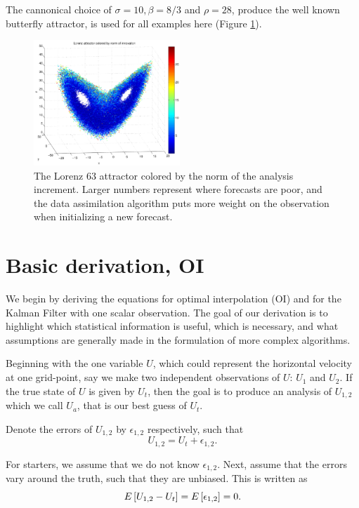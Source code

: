 \documentclass[12pt]{report}
\begin{document}
The cannonical choice of $\sigma = 10, \beta = 8/3$ and $\rho = 28$, produce the well known butterfly attractor, is used for all examples here (Figure \ref{fig:lorenzattractor}).

\begin{figure}[h!]
  \centering
  \includegraphics[width=0.49\textwidth]{figures/attractor-colored-by-innovation-prevPos3.pdf}
  \caption[The Lorenz 63 attractor colored by the norm of the analysis increment]{
    The Lorenz 63 attractor colored by the norm of the analysis increment.
    Larger numbers represent where forecasts are poor, and the data assimilation algorithm puts more weight on the observation when initializing a new forecast.
  }
  \label{fig:lorenzattractor}
\end{figure}

\section{Basic derivation, OI}

We begin by deriving the equations for optimal interpolation (OI) and for the Kalman Filter with one scalar observation.
The goal of our derivation is to highlight which statistical information is useful, which is necessary, and what assumptions are generally made in the formulation of more complex algorithms.

Beginning with the one variable $U$, which could represent the horizontal velocity at one grid-point, say we make two independent observations of $U$: $U_1$ and $U_2$.
If the true state of $U$ is given by $U_t$, then the goal is to produce an analysis of $U_{1,2}$ which we call $U_a$, that is our best guess of $U_t$.

Denote the errors of $U_{1,2}$ by $\epsilon _{1,2}$ respectively, such that
$$ U_{1,2} = U_t + \epsilon _{1,2} .$$

For starters, we assume that we do not know $\epsilon _{1,2}$.
Next, assume that the errors vary around the truth, such that they are unbiased.
This is written as
\begin{equation*} E \left [ U_{1,2}-U_t \right ] = E \left [ \epsilon _{1,2}  \right ] = 0. \end{equation*}
\end{document}
